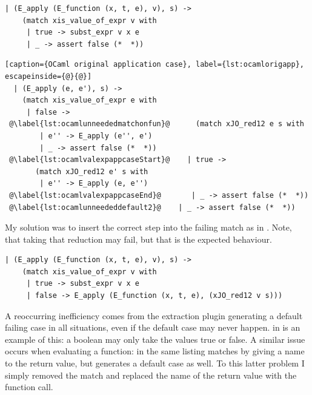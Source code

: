 \documentclass[12pt,twoside,notitlepage]{report}
\begin{document}
\vspace{3mm}

\begin{minipage}{\linewidth}

\begin{lstlisting}[caption={OCaml original substitution case}, label={lst:ocamlorigsub}]
  | (E_apply (E_function (x, t, e), v), s) ->
    (match xis_value_of_expr v with
     | true -> subst_expr v x e
     | _ -> assert false (*  *))
\end{lstlisting}

\end{minipage}

\begin{minipage}{\linewidth}

\begin{lstlisting}[caption={OCaml original application case}, label={lst:ocamlorigapp}, escapeinside={@}{@}]
  | (E_apply (e, e'), s) ->
    (match xis_value_of_expr e with
     | false ->
 @\label{lst:ocamlunneededmatchonfun}@      (match xJO_red12 e s with
        | e'' -> E_apply (e'', e')
        | _ -> assert false (*  *))
 @\label{lst:ocamlvalexpappcaseStart}@    | true ->
       (match xJO_red12 e' s with
        | e'' -> E_apply (e, e'')
 @\label{lst:ocamlvalexpappcaseEnd}@       | _ -> assert false (*  *))
 @\label{lst:ocamlunneededdefault2}@    | _ -> assert false (*  *))
\end{lstlisting}

\end{minipage}
My solution was to insert the correct step into the failing match as in . Note, that taking that reduction may fail, but that is the expected behaviour.


\vspace{3mm}
\begin{minipage}{\linewidth}

\begin{lstlisting}[caption={OCaml fixed substitution case}, label={lst:ocamlfixsub}]
  | (E_apply (E_function (x, t, e), v), s) ->
    (match xis_value_of_expr v with
     | true -> subst_expr v x e
     | false -> E_apply (E_function (x, t, e), (xJO_red12 v s)))
\end{lstlisting}

\end{minipage}
A reoccurring inefficiency comes from the extraction plugin generating a default failing case in all situations, even if the default case may never happen.  in  is an example of this: a boolean may only take the values true or false. A similar issue occurs when evaluating a function:   in the same listing matches by giving a name to the return value, but generates a default case as well. To this latter problem I simply removed the match and replaced the name of the return value with the function call.
\end{document}

